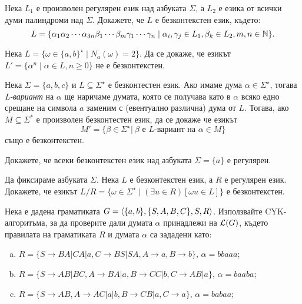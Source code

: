 \begin{problem}
  Нека $L_1$ е произволен регулярен език над азбуката $\Sigma$, 
  а $L_2$ е езика от всички думи палиндроми над $\Sigma$.
  Докажете, че $L$ е безконтекстен език, където:
  \[L = \{\alpha_1\alpha_2\cdots\alpha_{3n}\beta_1\cdots\beta_m\gamma_1\cdots\gamma_n \mid \alpha_i,\gamma_j \in L_1, \beta_k\in L_2, m,n \in \mathbb{N}\}.\]
\end{problem}

\begin{problem}
  Нека $L = \{\omega\in\{a,b\}^\star \mid N_a(\omega) = 2\}$.
  Да се докаже, че езикът $L' = \{\alpha^n \mid \alpha\in L, n \geq 0\}$ не е безконтекстен.
\end{problem}


\begin{problem}
  Нека $\Sigma = \{a,b,c\}$ и $L \subseteq \Sigma^\star$ е безконтестен език. Ако имаме дума 
  $\alpha \in \Sigma^\star$, тогава \emph{L-вариант} на $\alpha$ ще наричаме думата, която се получава като в $\alpha$ всяко едно 
  срещане на символа $a$ заменим с (евентуално различна) дума от $L$.
  Тогава, ако $M \subseteq \Sigma^*$ е произволен безконтестен език, да се докаже че езикът
  \begin{equation*}
    M' = \{\beta\in\Sigma^\star |\ \beta \text{ е $L$-вариант на } \alpha \in M \}
  \end{equation*}
  също е безконтекстен.
\end{problem}

\begin{problem}
  Докажете, че всеки безконтекстен език над азбуката $\Sigma = \{a\}$
  е регулярен.
\end{problem}

\begin{problem}
  Да фиксираме азбуката $\Sigma$.
  Нека $L$ е безконтекстен език, а $R$ е регулярен език.
  Докажете, че езикът
  $L/R = \{\omega \in \Sigma^\star \mid (\exists u \in R)[\omega u \in L]\}$
  е безконтекстен.
\end{problem}


\begin{problem}
  Нека е дадена граматиката $G = \langle{\{a,b\}, \{S,A,B,C\},S,R}\rangle$.
  Използвайте CYK-алгоритъма, за да проверите дали
  думата $\alpha$ принадлежи на $\mathcal{L}(G)$, където правилата на граматиката $R$ и думата $\alpha$
  са зададени като:
  \begin{enumerate}[a)]
  \item
    $R = \{S\rightarrow BA| CA|a, C\rightarrow BS|SA,A\rightarrow a, B\rightarrow b\}$, $\alpha=bbaaa$;
  \item
    $R =\{S\rightarrow AB|BC, A\rightarrow BA|a,B\rightarrow CC|b, C\rightarrow AB|a\}$, $\alpha=baaba$;
  \item
    $R = \{S\rightarrow AB, A\rightarrow AC|a|b,B\rightarrow CB|a, C\rightarrow a\}$, $\alpha=babaa$;
  \end{enumerate}
\end{problem}

